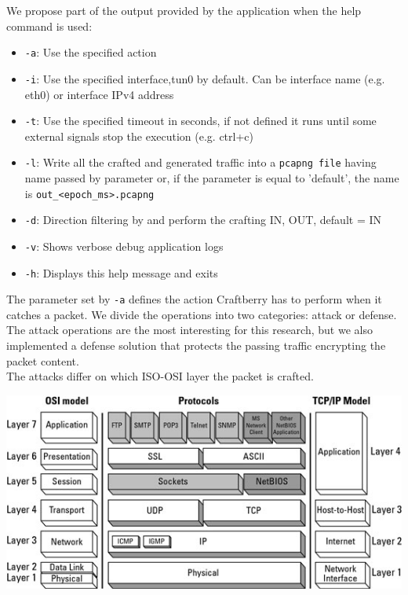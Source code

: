 \documentclass[12pt]{article}
\begin{document}
	We propose part of the output provided by the application when the help command is used:
	\begin{itemize}
		\item \lstinline{-a}: Use the specified action
		\item  \lstinline{-i}: Use the specified interface,tun0 by default. Can be interface name (e.g. eth0) or interface IPv4 address
		\item  \lstinline{-t}: Use the specified timeout in seconds, if not defined it runs until some external signals stop the execution (e.g. ctrl+c)
		\item  \lstinline{-l}: Write all the crafted and generated traffic into a \lstinline{pcapng file} having name passed by parameter or, if the parameter is equal to 'default', the name is \lstinline{out_<epoch_ms>.pcapng}
		\item  \lstinline{-d}: Direction filtering by and perform the crafting {IN, OUT}, default = IN
		\item  \lstinline{-v}: Shows verbose debug application logs
		\item  \lstinline{-h}: Displays this help message and exits
	\end{itemize}
	
	\bigbreak
		
	The parameter set by \lstinline{-a} defines the action Craftberry has to perform when it catches a packet. We divide the operations into two categories: attack or defense. The attack operations are the most interesting for this research, but we also implemented a defense solution that protects the passing traffic encrypting the packet content.\\
	The attacks differ on which ISO-OSI layer the packet is crafted.\\
	
	\bigbreak

	\begin{center}
		\includegraphics[width=0.7\linewidth]{images/iso_osi_layers.jpg}
	\end{center}
\end{document}
